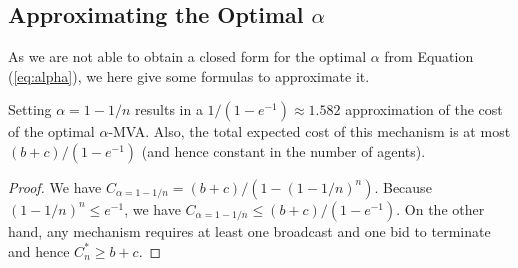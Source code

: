
\subsection{Approximating the Optimal $\alpha$}



As we are not able to obtain a closed form for the optimal $\alpha$ from
Equation (\ref{eq:alpha}), we here give some formulas to approximate it.




\begin{theorem}
Setting $\alpha = 1-1/n$ results in a $1/(1-e^{-1}) \approx 1.582$ approximation of the
cost of the optimal $\alpha$-MVA.  Also, the total expected cost of this
mechanism is at most $(b+c) / (1-e^{-1})$ (and hence constant in the
number of agents).
\end{theorem}

\begin{proof}
  We have $C_{\alpha = 1-1/n} = (b+c)/(1-(1-1/n)^n)$. Because $(1-1/n)^n
  \leq e^{-1}$, we have $C_{\alpha = 1-1/n} \leq (b+c)/(1-e^{-1})$.
On the other hand, any mechanism requires at
least one broadcast and one bid to terminate and hence $C^*_n \geq
b+c$. %
\end{proof}

